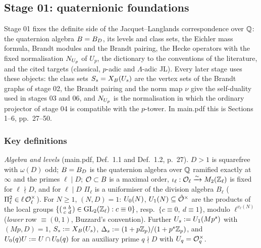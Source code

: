 \subsection{Stage 01: quaternionic foundations}\label{ss:stage01}
Stage 01 fixes the definite side of the Jacquet--Langlands correspondence over $\mathbb{Q}$: the quaternion algebra $B=B_D$,
its levels and class sets, the Eichler mass formula, Brandt modules and the Brandt pairing, the Hecke operators with
the fixed normalisation $N_{U_p}$ of $U_p$, the dictionary to the conventions of the literature, and the cited targets
(classical, $p$-adic and $\Lambda$-adic JL). Every later stage uses these objects: the class sets $S_s=X_B(U_s)$ are the
vertex sets of the Brandt graphs of stage 02, the Brandt pairing and the norm map $\nu$ give the self-duality used in stages
03 and 06, and $N_{U_p}$ is the normalisation in which the ordinary projector of stage 04 is compatible with the $p$-tower.
In main.pdf this is Sections 1--6, pp.~27--50.
\begingroup\sloppy

\subsubsection*{Key definitions}
\emph{Algebra and levels} (main.pdf, Def.~1.1 and Def.~1.2, p.~27). $D>1$ is squarefree with $\omega(D)$ odd; $B=B_D$ is the
quaternion algebra over $\mathbb{Q}$ ramified exactly at $\infty$ and the primes $\ell\mid D$; $\mathcal{O}\subset B$ is a maximal order,
$\iota_\ell:\mathcal{O}_\ell\xrightarrow{\sim}M_2(\mathbb{Z}_\ell)$ is fixed for $\ell\nmid D$, and for $\ell\mid D$ $\Pi_\ell$ is a uniformiser
of the division algebra $B_\ell$ ($\Pi_\ell^2\in\ell\,\mathcal{O}_\ell^\times$). For $N\ge1$, $(N,D)=1$: $U_0(N)$, $U_1(N)\subseteq\hat{\mathcal{O}}^\times$
are the products of the local groups $\{(\begin{smallmatrix}a&b\\c&d\end{smallmatrix})\in\mathrm{GL}_2(\mathbb{Z}_\ell):c\equiv0\}$, resp.\
$\{c\equiv0,\ d\equiv1\}$, modulo $\ell^{v_\ell(N)}$ (\emph{lower} row $\equiv(0,1)$, Buzzard's convention). Further
$U_s:=U_1(Mp^s)$ with $(Mp,D)=1$, $S_s:=X_B(U_s)$, $\Delta_s:=(1+p\mathbb{Z}_p)/(1+p^s\mathbb{Z}_p)$, and $U_0(q)U:=U\cap U_0(q)$ for an auxiliary
prime $q\nmid D$ with $U_q=\mathcal{O}_q^\times$.

